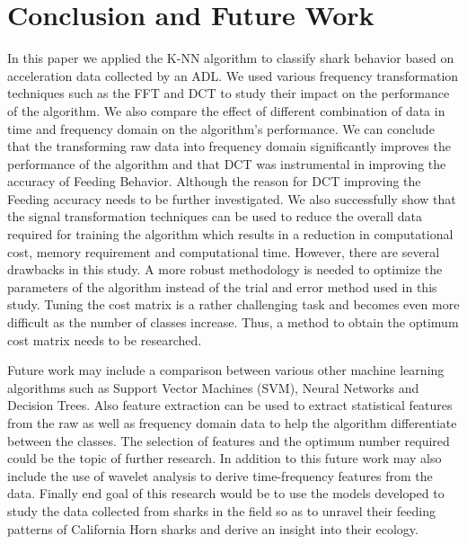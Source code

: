 \documentclass[conference]{IEEEtran}
\begin{document}
\section{Conclusion and Future Work}
In this paper we applied the K-NN algorithm to classify shark behavior based on acceleration data collected by an ADL. We used various frequency transformation techniques such as the FFT and DCT to study their impact on the performance of the algorithm. We also compare the effect of different combination of data in time and frequency domain on the algorithm’s performance. We can conclude that the transforming raw data into frequency domain significantly improves the performance of the algorithm and that DCT was instrumental in improving the accuracy of Feeding Behavior. Although the reason for DCT improving the Feeding accuracy needs to be further investigated. We also successfully show that the signal transformation techniques can be used to reduce the overall data required for training the algorithm which results in a reduction in computational cost, memory requirement and computational time. However, there are several drawbacks in this study. A more robust methodology is needed to optimize the parameters of the algorithm instead of the trial and error method used in this study. Tuning the cost matrix is a rather challenging task and becomes even more difficult as the number of classes increase. Thus, a method to obtain the optimum cost matrix needs to be researched.

Future work may include a comparison between various other machine learning algorithms such as Support Vector Machines (SVM), Neural Networks and Decision Trees. Also feature extraction can be used to extract statistical features from the raw as well as frequency domain data to help the algorithm differentiate between the classes. The selection of features and the optimum number required could be the topic of further research. In addition to this future work may also include the use of wavelet analysis to derive time-frequency features from the data. Finally end goal of this research would be to use the models developed to study the data collected from sharks in the field so as to unravel their feeding patterns of California Horn sharks and derive an insight into their ecology.



\end{document}
